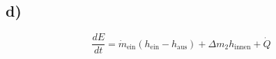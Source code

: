

\subsection*{d)}
\begin{equation*}
\frac{dE}{dt} = \dot{m}_{\text{ein}} \left( h_{\text{ein}} - h_{\text{aus}} \right) + \Delta m_2 h_{\text{innen}} + \dot{Q}
\end{equation*}